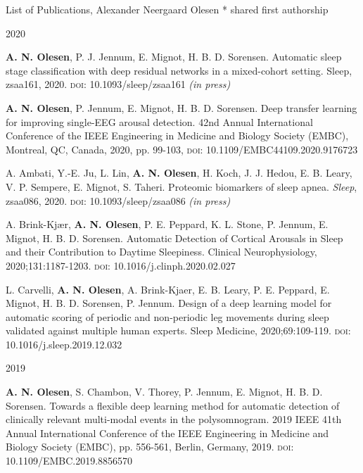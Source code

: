 \documentclass{resume} %
\begin{document}
\begin{rSection}{List of Publications, Alexander Neergaard Olesen}
	\medskip
    \mbox{*} shared first authorship
    
    \begin{rSubsection}{2020}{}{}{}
        \item \textbf{A. N. Olesen}, P. J. Jennum, E. Mignot, H. B. D. Sorensen. Automatic sleep stage classification with deep residual networks in a mixed-cohort setting. Sleep, zsaa161, 2020. \textsc{doi}: 10.1093/sleep/zsaa161 \textit{(in press)} \medskip
        
        \item \textbf{A. N. Olesen}, P. Jennum, E. Mignot, H. B. D. Sorensen. Deep transfer learning for improving single-EEG arousal detection. 42nd Annual International Conference of the IEEE Engineering in Medicine and Biology Society (EMBC), Montreal, QC, Canada, 2020, pp. 99-103, \textsc{doi}: 10.1109/EMBC44109.2020.9176723 \medskip
        
        \item A. Ambati, Y.-E. Ju, L. Lin, \textbf{A. N. Olesen}, H. Koch, J. J. Hedou, E. B. Leary, V. P. Sempere, E. Mignot, S. Taheri. Proteomic biomarkers of sleep apnea. \textit{Sleep}, zsaa086, 2020. \textsc{doi}: 10.1093/sleep/zsaa086 \textit{(in press)} \medskip
        
        \item A. Brink-Kjær, \textbf{A. N. Olesen}, P. E. Peppard, K. L. Stone, P. Jennum, E. Mignot, H. B. D. Sorensen. Automatic Detection of Cortical Arousals in Sleep and their Contribution to Daytime Sleepiness. Clinical Neurophysiology, 2020;131:1187-1203. \textsc{doi}: 10.1016/j.clinph.2020.02.027 \medskip
	    
	    \item L. Carvelli, \textbf{A. N. Olesen}, A. Brink-Kjaer, E. B. Leary, P. E. Peppard, E. Mignot, H. B. D. Sorensen, P. Jennum. Design of a deep learning model for automatic scoring of periodic and non-periodic leg movements during sleep validated against multiple human experts. Sleep Medicine, 2020;69:109-119. \textsc{doi}: 10.1016/j.sleep.2019.12.032
	\end{rSubsection}
    
	\begin{rSubsection}{2019}{}{}{}
	    \item \textbf{A. N. Olesen}, S. Chambon, V. Thorey, P. Jennum, E. Mignot, H. B. D. Sorensen. Towards a flexible deep learning method for automatic detection of clinically relevant multi-modal events in the polysomnogram. 2019 IEEE 41th Annual International Conference of the IEEE Engineering in Medicine and Biology Society (EMBC), pp. 556-561, Berlin, Germany, 2019. \textsc{doi}: 10.1109/EMBC.2019.8856570
	\end{rSubsection}
	

\end{rSection}
\end{document}
